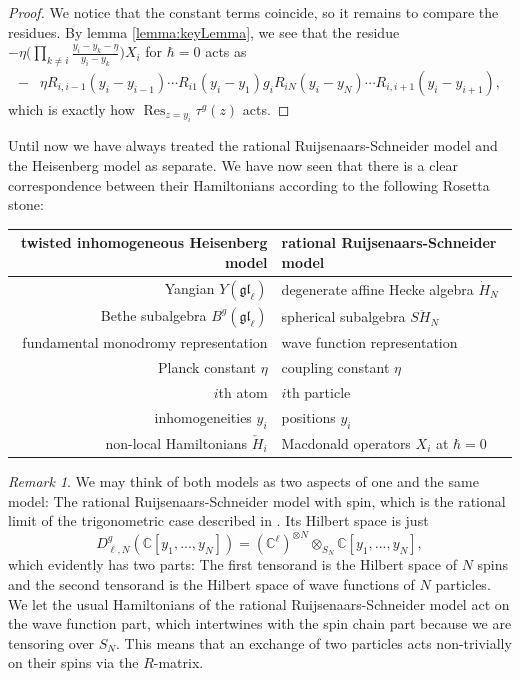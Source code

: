 \documentclass[11pt]{report}
\theoremstyle{definition}
\theoremstyle{remark}
\newtheorem*{remark}{Remark}
\theoremstyle{remark}
\newcommand{\C}{\mathbb{C}}
\begin{document}
\begin{proof}
We notice that the constant terms coincide, so it remains to compare the residues. By lemma \ref{lemma:keyLemma}, we see that the residue $-\eta \Big( \prod_{k \neq i} \frac{y_i-y_k-\eta}{y_i-y_k} \Big) X_i$ for $\hbar = 0$ acts as
\begin{align*}
-&\eta R_{i,i-1}(y_i-y_{i-1}) \cdots R_{i1}(y_i-y_1) g_i R_{iN}(y_i-y_N) \cdots R_{i,i+1}(y_i-y_{i+1}),
\end{align*}
which is exactly how $\operatorname{Res}_{z=y_i} \tau^g(z)$ acts.
\end{proof}

Until now we have always treated the rational Ruijsenaars-Schneider model and the Heisenberg model as separate. We have now seen that there is a clear correspondence between their Hamiltonians according to the following Rosetta stone:
\begin{center}
\begin{tabular}{|r||l|}
\hline
twisted inhomogeneous Heisenberg model & rational Ruijsenaars-Schneider model \\
\hline
Yangian $Y(\mathfrak{gl}_\ell)$ & degenerate affine Hecke algebra $\dot H_N$ \\
Bethe subalgebra $B^g(\mathfrak{gl}_\ell)$ & spherical subalgebra $S\ddot H_N$ \\
fundamental monodromy representation & wave function representation \\
Planck constant $\eta$ & coupling constant $\eta$ \\
$i$th atom & $i$th particle \\
inhomogeneities $y_i$ & positions $y_i$ \\
non-local Hamiltonians $\check H_i$ & Macdonald operators $X_i$ at $\hbar = 0$ \\
\hline
\end{tabular}
\end{center}

\begin{remark}
We may think of both models as two aspects of one and the same model: The rational Ruijsenaars-Schneider model with spin, which is the rational limit of the trigonometric case described in \cite{article:lamers:2022}. Its Hilbert space is just
\begin{equation*}
D_{\ell,N}^g(\C[y_1,...,y_N]) = (\C^\ell)^{\otimes N} \otimes_{S_N} \C[y_1,...,y_N],
\end{equation*}
which evidently has two parts: The first tensorand is the Hilbert space of $N$ spins and the second tensorand is the Hilbert space of wave functions of $N$ particles. We let the usual Hamiltonians of the rational Ruijsenaars-Schneider model act on the wave function part, which intertwines with the spin chain part because we are tensoring over $S_N$. This means that an exchange of two particles acts non-trivially on their spins via the $R$-matrix.
\end{remark}
\end{document}
